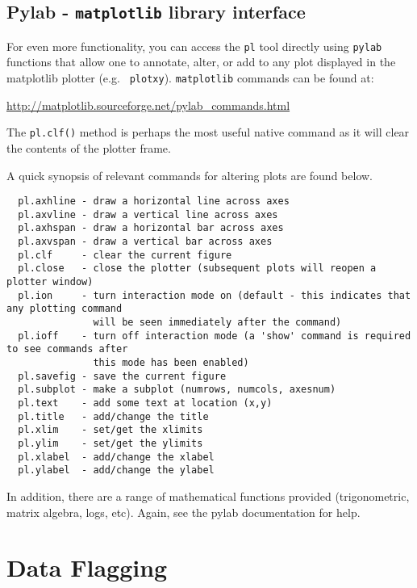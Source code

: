 \subsection{Pylab - {\tt matplotlib} library interface}
\label{section:edtool.pl.pylab}

For even more functionality, you can access the {\tt pl} tool directly
using {\tt pylab} functions that allow one to annotate, alter, or add
to any plot displayed in the matplotlib plotter (e.g. {\tt
plotxy}). {\tt matplotlib} commands can be found at:

\url{http://matplotlib.sourceforge.net/pylab\_commands.html}

The {\tt pl.clf()} method is perhaps the most useful native command as it will
clear the contents of the plotter frame.

A quick synopsis of relevant commands for altering plots are found
below. 

\small
\begin{verbatim}
  pl.axhline - draw a horizontal line across axes
  pl.axvline - draw a vertical line across axes
  pl.axhspan - draw a horizontal bar across axes
  pl.axvspan - draw a vertical bar across axes
  pl.clf     - clear the current figure
  pl.close   - close the plotter (subsequent plots will reopen a plotter window)
  pl.ion     - turn interaction mode on (default - this indicates that any plotting command
               will be seen immediately after the command)
  pl.ioff    - turn off interaction mode (a 'show' command is required to see commands after
               this mode has been enabled)
  pl.savefig - save the current figure
  pl.subplot - make a subplot (numrows, numcols, axesnum)
  pl.text    - add some text at location (x,y)
  pl.title   - add/change the title
  pl.xlim    - set/get the xlimits
  pl.ylim    - set/get the ylimits
  pl.xlabel  - add/change the xlabel
  pl.ylabel  - add/change the ylabel
\end{verbatim}
\normalsize

In addition, there are a range of mathematical functions provided
(trigonometric, matrix algebra, logs, etc). Again, see the pylab
documentation for help.

\section{Data Flagging}
\label{section:flagging}

